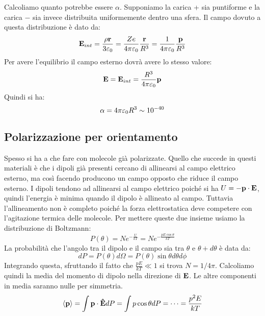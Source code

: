 Calcoliamo quanto potrebbe essere $\alpha$. Supponiamo la carica + sia puntiforme e la carica $-$ sia invece distribuita uniformemente dentro una sfera. Il campo dovuto a questa distribuzione è dato da:
\begin{equation}
    \mbf E_{int} = \frac{ \rho \mbf r }{ 3 \ez } = \qpe[Ze] \frac{ \mbf r }{ R^3 } = \qpe \frac{ \mbf p }{ R^3 } 
\end{equation}
Per avere l'equilibrio il campo esterno dovrà avere lo stesso valore:
\begin{equation}
    \mbf E = \mbf E_{int} = \qpe[R^3] \mbf p
\end{equation}
Quindi si ha:
\begin{equation}
    \alpha = 4 \pi \ez R^3 \sim 10^{-40}
\end{equation}


\subsection{Polarizzazione per orientamento} %
\label{sub:polarizzazione_per_orientamento}

Spesso si ha a che fare con molecole già polarizzate. Quello che succede in questi materiali è che i dipoli già presenti cercano di allinearsi al campo elettrico esterno, ma così facendo producono un campo opposto che riduce il campo esterno. I dipoli tendono ad allinearsi al campo elettrico poiché si ha $U = - \mbf p \cdot \mbf E$, quindi l'energia è minima quando il dipolo è allineato al campo. Tuttavia l'allineamento non è completo poiché la forza elettrostatica deve competere con l'agitazione termica delle molecole. Per mettere queste due insieme usiamo la distribuzione di Boltzmann:
\begin{equation}
    P(\theta) = N e^{-\frac{ U }{ kT } } = N e^{-\frac{ p E \cos \theta }{ kT } }
\end{equation}
La probabilità che l'angolo tra il dipolo e il campo sia tra $\theta$ e $\theta + d\theta$ è data da:
\begin{equation}
    dP = P(\theta) d\Omega = P(\theta) \sin \theta d\theta d\phi
\end{equation}
Integrando questa, sfruttando il fatto che $\frac{ pE }{ kT } \ll 1$ si trova $N = 1/4\pi$.
Calcoliamo quindi la media del momento di dipolo nella direzione di $\mbf E$. Le altre componenti in media saranno nulle per simmetria.
\begin{equation}
    \langle \mbf p \rangle = \int \mbf p \cdot \vers E dP = \int p \cos \theta dP = \cdots = \frac{ p^2 E }{ kT } 
\end{equation}


